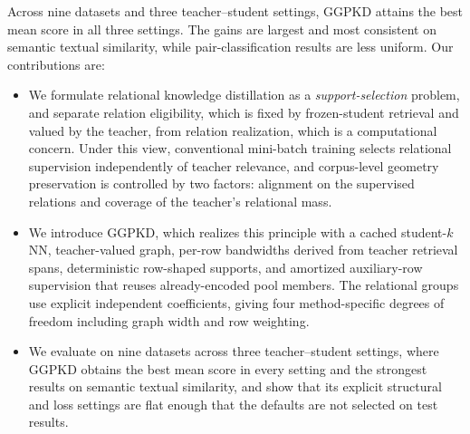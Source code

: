 Across nine datasets and three teacher--student settings, GGPKD attains the
best mean score in all three settings. The gains are largest and most
consistent on semantic textual similarity, while pair-classification results
are less uniform. Our contributions are:
\begin{itemize}
    \item We formulate relational knowledge distillation as a
    \emph{support-selection} problem, and separate relation eligibility, which
    is fixed by frozen-student retrieval and valued by the teacher, from
    relation realization, which is
    a computational concern. Under this view, conventional mini-batch training
    selects relational supervision independently of teacher relevance, and
    corpus-level geometry preservation is controlled by two factors: alignment
    on the supervised relations and coverage of the teacher's relational mass.

    \item We introduce \textsc{GGPKD}, which realizes this principle with a
    cached student-$k$NN, teacher-valued graph, per-row bandwidths derived from
    teacher retrieval spans, deterministic row-shaped supports, and amortized
    auxiliary-row supervision that reuses already-encoded pool members. The
    relational groups use explicit independent coefficients, giving four
    method-specific degrees of freedom including graph width and row weighting.

    \item We evaluate on nine datasets across three teacher--student settings,
    where GGPKD obtains the best mean score in every setting and the strongest
    results on semantic textual similarity, and show that its explicit
    structural and loss settings are flat enough that the defaults are not
    selected on test results.
\end{itemize}
